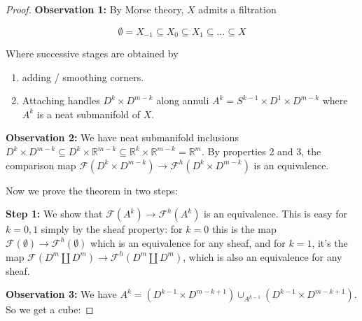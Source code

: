 \documentclass{article}
\newtheorem{proposed work}[theorem]{Proposed Work}
\begin{document}
\begin{proof}

\textbf{Observation 1:} By Morse theory, $X$ admits a filtration

\[ \emptyset  = X_{-1} \subseteq X_0 \subseteq X_1 \subseteq \dots \subseteq X \]

Where successive stages are obtained by

\begin{enumerate}
\item adding / smoothing corners.
\item Attaching handles $D^k \times D^{m-k}$ along annuli $A^k = S^{k-1} \times D^1 \times D^{m-k}$ where $A^k$ is a neat submanifold of $X$.
\end{enumerate}

\textbf{Observation 2:} We have neat submanifold inclusions $D^k \times D^{m-k} \subseteq D^k \times \mathbb R^{m-k} \subseteq \mathbb R^k \times \mathbb R^{m-k} = \mathbb R^m$. By properties 2 and 3, the comparison map $\mathcal F(D^k \times D^{m-k}) \to \mathcal F^h(D^k \times D^{m-k})$ is an equivalence.

Now we prove the theorem in two steps:

\textbf{Step 1:} We show that $\mathcal F(A^k) \to \mathcal F^h(A^k)$ is an equivalence. This is easy for $k=0,1$ simply by the sheaf property: for $k=0$ this is the map $\mathcal F(\emptyset) \to \mathcal F^h(\emptyset)$ which is an equivalence for any sheaf, and for $k=1$, it's the map $\mathcal F(D^m \amalg D^m) \to \mathcal F^h(D^m \amalg D^m)$, which is also an equivalence for any sheaf.

\textbf{Observation 3:} We have $A^k = (D^{k-1} \times D^{m-k+1}) \cup_{A^{k-1}} (D^{k-1} \times D^{m-k+1})$. So we get a cube:



\end{proof}
\end{document}
